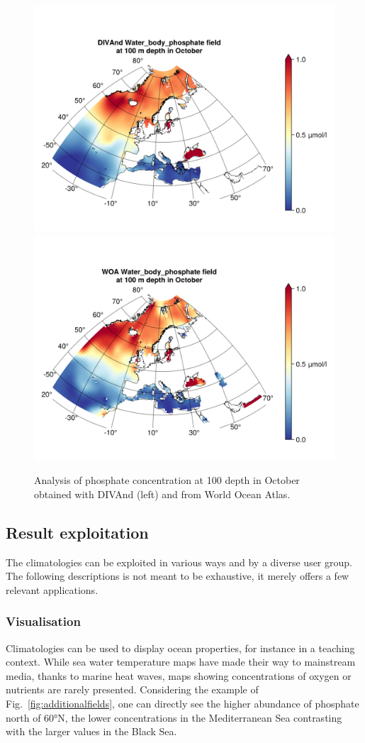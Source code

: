 \documentclass[essd, manuscript]{copernicus}
\begin{document}
\begin{figure}[t]
\includegraphics[width=.49\textwidth]{Water_body_phosphate_depth-100_month-10_DIVAnd}\includegraphics[width=.49\textwidth]{Water_body_phosphate_depth-100_month-10_WOA.png}
\caption{Analysis of phosphate concentration at 100 depth in October obtained with DIVAnd (left) and from World Ocean Atlas.\label{fig:comparisonWOA}}
\end{figure}


\subsection{Result exploitation}

The climatologies can be exploited in various ways and by a diverse user group. The following descriptions is not meant to be exhaustive, it merely offers a few relevant applications.

\subsubsection{Visualisation}

Climatologies can be used to display ocean properties, for instance in a teaching context. While sea water temperature maps have made their way to mainstream media, thanks to marine heat waves, maps showing concentrations of oxygen or nutrients are rarely presented. Considering the example of Fig.~\ref{fig:additionalfields}, one can directly see the higher abundance of phosphate north of 60°N, the lower concentrations in the Mediterranean Sea contrasting with the larger values in the Black Sea.
\end{document}
